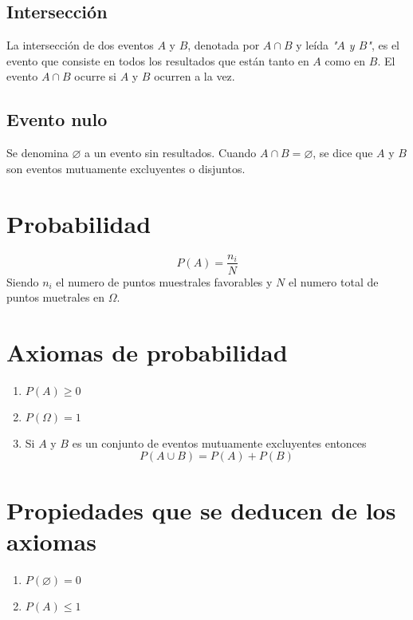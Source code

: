 \documentclass{report}
\begin{document}
      \subsection*{Intersección}
      La intersección de dos eventos $A$ y $B$, denotada por $A\cap B$ y leída 
      \textit{"$A$ y $B$"}, es el evento que consiste en todos los resultados 
      que están tanto en $A$ como en $B$. El evento $A\cap B$ ocurre si $A$ y
      $B$ ocurren a la vez.

      \subsection*{Evento nulo}
      Se denomina $\varnothing$ a un evento sin resultados. Cuando $A\cap B=\varnothing$, 
      se dice que $A$ y $B$ son eventos mutuamente excluyentes o disjuntos.

    \section*{Probabilidad}
    
    \begin{equation*}
      P(A)=\frac{n_i}{N}
    \end{equation*}
    Siendo $n_i$ el numero de puntos muestrales favorables y $N$ el numero 
    total de puntos muetrales en $\Omega$.

    \section*{Axiomas de probabilidad}
      
      \begin{enumerate}
        \item $P(A)\geqslant0$
        \item $P(\Omega)=1$
        \item Si $A$ y $B$ es un conjunto de eventos mutuamente excluyentes entonces
          \begin{equation*}
            P(A\cup B)=P(A)+P(B)
          \end{equation*}
      \end{enumerate}

    \section*{Propiedades que se deducen de los axiomas}
      
      \begin{enumerate}
        \item $P(\varnothing)=0$
        \item $P(A)\leqslant1$
      \end{enumerate}
\end{document}
